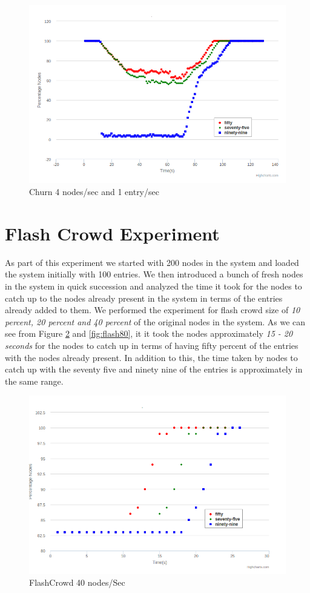 \documentclass[12pt,a4paper,twoside,openright]{book}
\begin{document}
\begin{figure}[h]
	\includegraphics[scale=0.5]{200-4Node-1Entry}
	\caption{Churn 4 nodes/sec and 1 entry/sec}
	\label{fig:churn}
\end{figure}

\section{Flash Crowd Experiment}
As part of this experiment we started with 200 nodes in the system and loaded the system initially with 100 entries. We then introduced a bunch of fresh nodes in the system in quick succession and analyzed the time it took for the nodes to catch up to the nodes already present in the system in terms of the entries already added to them. We performed the experiment for flash crowd size of \textit{10 percent, 20 percent and 40 percent} of the original nodes in the system. As we can see from Figure \ref{fig:flash40} and \ref{fig:flash80}, it it took the nodes approximately \textit{ 15 - 20 seconds} for the nodes to catch up in terms of having fifty percent of the entries with the nodes already present. In addition to this, the time taken by nodes to catch up with the seventy five and ninety nine of the entries is approximately in the same range. 

\begin{figure}[h]
	\includegraphics[scale=0.5]{200-40Nodes}
	\caption{FlashCrowd 40 nodes/Sec }
	\label{fig:flash40}
\end{figure}
\end{document}

